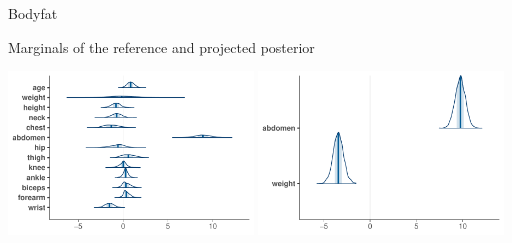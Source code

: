 \documentclass[t]{beamer}
\begin{document}
\begin{frame}{Bodyfat}

  Marginals of the reference and projected posterior

  \vspace{\baselineskip}
  
  \begin{minipage}[t]{1\linewidth}
    \hspace{-1cm}
    \includegraphics[width=6.5cm]{bodyfat_mcmc_areas.pdf}
  \includegraphics[width=6.5cm]{bodyfat_proj_mcmc_areas.pdf}
\end{minipage}
\end{frame}
\end{document}
